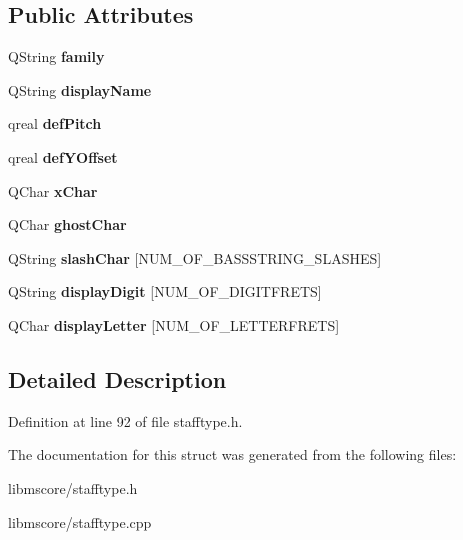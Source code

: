 \subsection*{Public Attributes}
\begin{DoxyCompactItemize}
\item 
\mbox{\label{struct_ms_1_1_tablature_fret_font_abf4b71f2e6b1d2bf7062fcbd67aa8f7a}} 
Q\+String {\bfseries family}
\item 
\mbox{\label{struct_ms_1_1_tablature_fret_font_a0865f26c52a93e4f3df75f0e5b73de4c}} 
Q\+String {\bfseries display\+Name}
\item 
\mbox{\label{struct_ms_1_1_tablature_fret_font_acdc973e8ced65176fb398bd391262af4}} 
qreal {\bfseries def\+Pitch}
\item 
\mbox{\label{struct_ms_1_1_tablature_fret_font_a09a5ec643479b1e20c18d6036ddf4a25}} 
qreal {\bfseries def\+Y\+Offset}
\item 
\mbox{\label{struct_ms_1_1_tablature_fret_font_a1c5d6667eadac9112911b7f72b9adc16}} 
Q\+Char {\bfseries x\+Char}
\item 
\mbox{\label{struct_ms_1_1_tablature_fret_font_aa3f7c0acb5c8bb2cc44c89c72c9a7c4e}} 
Q\+Char {\bfseries ghost\+Char}
\item 
\mbox{\label{struct_ms_1_1_tablature_fret_font_a799cca7c6e02619700db4430448597cd}} 
Q\+String {\bfseries slash\+Char} \mbox{[}N\+U\+M\+\_\+\+O\+F\+\_\+\+B\+A\+S\+S\+S\+T\+R\+I\+N\+G\+\_\+\+S\+L\+A\+S\+H\+ES\mbox{]}
\item 
\mbox{\label{struct_ms_1_1_tablature_fret_font_a76efb45a379ccf0766f5e5872a9b71b5}} 
Q\+String {\bfseries display\+Digit} \mbox{[}N\+U\+M\+\_\+\+O\+F\+\_\+\+D\+I\+G\+I\+T\+F\+R\+E\+TS\mbox{]}
\item 
\mbox{\label{struct_ms_1_1_tablature_fret_font_a09c70fd8d5f4ff848f519e6da497c0d1}} 
Q\+Char {\bfseries display\+Letter} \mbox{[}N\+U\+M\+\_\+\+O\+F\+\_\+\+L\+E\+T\+T\+E\+R\+F\+R\+E\+TS\mbox{]}
\end{DoxyCompactItemize}


\subsection{Detailed Description}


Definition at line 92 of file stafftype.\+h.



The documentation for this struct was generated from the following files\+:\begin{DoxyCompactItemize}
\item 
libmscore/stafftype.\+h\item 
libmscore/stafftype.\+cpp\end{DoxyCompactItemize}
